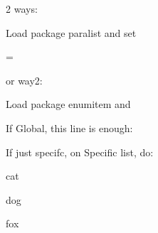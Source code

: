 2 ways:

Load package paralist and set
\usepackage{paralist}
  \let\itemize\compactitem
  \let\enditemize\endcompactitem
  \let\enumerate\compactenum
  \let\endenumerate\endcompactenum
  \let\description\compactdesc
  \let\enddescription\endcompactdesc
  \pltopsep=\medskipamount
  \plitemsep=1pt
  \plparsep=1pt

or way2:

Load package enumitem and 

\usepackage{enumitem }
If Global, this line is enough:

If just specifc, on Specific list, do:
\begin{compactitem}
	\item cat
	\item dog 
	\item fox 
\end{compactitem}
